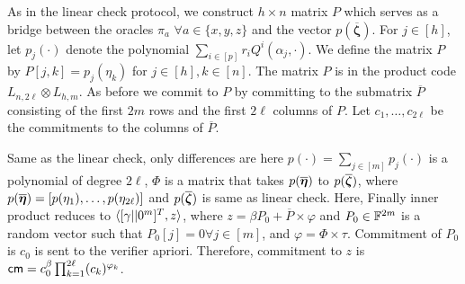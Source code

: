  As in the linear check protocol, we
construct $h\times n$ matrix $P$ which serves as a bridge between the oracles
$\pi_a$ $\forall a \in \{x,y,z\}$ and the vector $p(\overline{\bm{\zeta}})$.
For $j\in [h]$, let $p_j(\cdot)$ denote the polynomial $\sum_{i\in[p]}
r_iQ^i(\alpha_j, \cdot)$. We define the matrix $P$ by $P[j,k]= p_j(\eta_k)$ for
$j\in[h], k\in[n]$. The matrix $P$ is in the product code $L_{n,2\ell}\otimes L_{h,m}$. As
before we commit to $P$ by committing to the submatrix $\overline{P}$
consisting of the first $2m$ rows and the first $2\ell$ columns of $P$. Let
$c_1,\ldots,c_{2\ell}$ be the commitments to the columns of $\overline{P}$.

 Same as the linear check, only differences are here $p(\cdot) = \sum_{j\in[m]}p_j(\cdot)$ is a polynomial of degree $2\ell$, $\Phi$ is a matrix that takes $p(\overline{\bm{\eta}})$ to $p(\overline{\bm{\zeta}})$, where $p(\overline{\bm{\eta}}) = [p(\eta_1),\ldots, p(\eta_{2\ell})]$ and $p(\overline{\bm{\zeta}})$ is same as linear check. Here, Finally inner product reduces to $\langle [\gamma||0^m]^T,z\rangle$, where $z= \beta P_0 + \overline{P}\times \varphi$ and $P_0\in \mathbb{F}^{2m}$ is a random vector such that $P_0[j]=0 \forall j\in [m]$, and $\varphi = \Phi\times \tau$. Commitment of $P_0$ is $c_0$ is sent to the verifier apriori. Therefore, commitment to $z$ is $\mathsf{cm} = c_0^{\beta}\prod_{k=1}^{2\ell}(c_k)^{\varphi_k}$.

\begin{comment} 
Let$\overline{\bm{\eta}}$ denote the vector $(\eta_1, \ldots, \eta_{2\ell})$, and
let $\Phi$ denote the $s\times 2\ell$ matrix such that
$p(\overline{\bm{\zeta}}) = \Phi p(\overline{\bm{\eta}})$. Observe
that $p(\overline{\bm{\eta}}) = \overline{P}^T [\gamma||0^m]^T$ and thus
$p(\zetabar) = \Phi \overline{P}^T [\gamma||0^m]^T$. Now we have
$\innp{\tau}{p(\zetabar)} = p(\zetabar)^T \tau = [\gamma||0^m] \overline{P}
\Phi^T \tau = \innp{[\gamma||0^m]^T}{\overline{P}\varphi}$ where $\varphi =
\Phi^T \tau$. Given commitments $c_1, \ldots, c_{2\ell}$, the commitment to
$\overline{P}\varphi$ can be computed as $\cm = \prod_{k\in[2\ell]} (c_k)^{\varphi_k}$. Using an inner product argument the prover can show that the commitment
$\cm$ opens to vector $z$ such that $\innp{[\gamma||0^m]^T}{z} = 0$. Binding
property of the commitment ensures that $z = \overline{P}\varphi$ with
overwhelming probability.
As in the linear check, the prover uses a random vector $P_0\in \FF^{2m}$ such
that $P_0[j]=0$ for $j\in [m]$ to blind the vector $\overline{P}\varphi$. The
prover initially commits to $P_0$ by sending a commitment $c_0$ to it, and later
sends uses the vector $z=\beta P_0 + \overline{P}\varphi$ in the preceeding
inner product check.
\end{comment}

